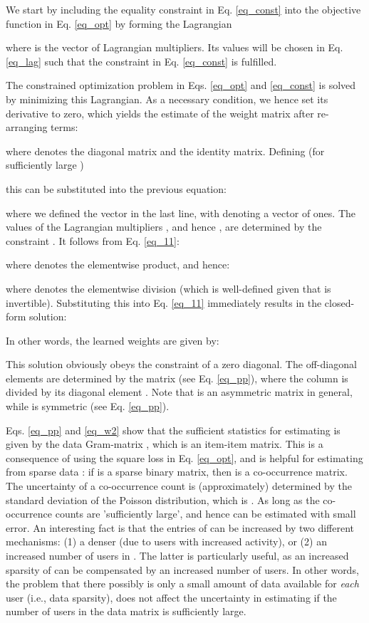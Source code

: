 \documentclass[sigconf]{acmart}
\begin{document}
We start by including the equality constraint in Eq. \ref{eq_const} into the objective function in Eq. \ref{eq_opt} by forming the Lagrangian

where   is the vector of Lagrangian multipliers. Its values  will be chosen in  Eq. \ref{eq_lag} such that the constraint in Eq. \ref{eq_const} is fulfilled.

The constrained optimization problem in  Eqs. \ref{eq_opt} and \ref{eq_const} is  solved by minimizing this Lagrangian. As a necessary condition, we hence set its derivative  to zero, which yields the estimate  of the weight matrix  after re-arranging terms:

where  denotes the  diagonal matrix and  the identity matrix.
Defining (for sufficiently large )

this can be substituted into the previous equation:

where we defined the vector  in the last line, with  denoting a vector of ones.
The values of the Lagrangian multipliers , and hence , are determined by  the constraint . It follows  from Eq. \ref{eq_11}:

where  denotes the elementwise product, and hence:

where  denotes the elementwise division (which is well-defined given that  is invertible).
Substituting this  into Eq. \ref{eq_11} immediately results in the closed-form solution:

In other words, the learned weights  are given by:

This solution obviously obeys the constraint of a zero diagonal. The off-diagonal elements are determined by the matrix  (see Eq. \ref{eq_pp}), where the  column is divided by its diagonal element . Note that  is an asymmetric matrix in general, while  is symmetric (see Eq. \ref{eq_pp}).



Eqs. \ref{eq_pp} and \ref{eq_w2} show that the sufficient statistics for estimating  is given by the data Gram-matrix , which is an item-item matrix. This is a consequence of using the square loss in Eq. \ref{eq_opt}, and is helpful for  estimating  from sparse data : if  is a sparse binary matrix, then  is a co-occurrence matrix. The uncertainty of a co-occurrence count  is (approximately) determined by the standard deviation of the Poisson distribution, which is . As long as the co-occurrence counts  are 'sufficiently large',  and hence  can be estimated with small error. An interesting fact is that the entries of  can be increased by two different mechanisms: (1) a denser  (due to users with increased activity), or (2) an increased number of  users in . The latter is particularly useful, as an increased sparsity of  can be compensated by an increased number of users. In other words, the problem that there possibly is only a small amount of data available for \emph{each} user (i.e., data sparsity), does not affect the uncertainty in  estimating   if the number of users in the data matrix  is sufficiently large.   
\end{document}
